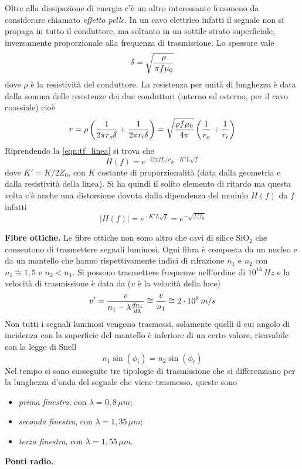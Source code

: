 \documentclass[a4paper,portrait,12pt]{article}
\theoremstyle{definition}
\begin{document}
Oltre alla dissipazione di energia c'è un altro interessante fenomeno da considerare chiamato \textit{effetto
pelle}. In un cavo elettrico infatti il segnale non si propaga in tutto il conduttore, ma soltanto in 
un sottile strato superficiale, inversamente proporzionale alla frequenza di trasmissione. Lo spessore vale
\begin{equation}
\delta = \sqrt{\rho \over \pi f \mu_0}
\end{equation}
dove $\rho$ è la resistività del conduttore. La resistenza per unità di lunghezza è data dalla somma delle
resistenze dei due conduttori (interno ed esterno, per il cavo coassiale) cioè
\begin{equation}
r = \rho \left({1 \over 2\pi r_o \delta} + {1 \over 2\pi r_i \delta}\right) = 
\sqrt{\rho f \mu_0 \over 4 \pi}\left({1\over r_o} + {1\over r_i}\right)
\end{equation}
Riprendendo la \ref{eqn:tf_linea} si trova che
\begin{equation}
H(f) = e^{-i 2\pi f L/v} e^{-K'L\sqrt{f}}
\end{equation}
dove $K' = K/2Z_0$, con $K$ costante di proporzionalità (data dalla geometria e dalla resistività della linea).
Si ha quindi il solito elemento di ritardo ma questa volta c'è anche una distorsione dovuta dalla dipendenza 
del modulo $H(f)$ da $f$ infatti
\begin{equation}
\left|H(f)\right| = e^{-K'L\sqrt{f}} = e^{-\sqrt{f/f_0}}
\end{equation}
\bigskip

\textbf{Fibre ottiche.} Le fibre ottiche non sono altro che cavi di silice $\text{SiO}_2$ che consentono
di trasmettere segnali luminosi. Ogni fibra è composta da un nucleo e da un mantello che hanno rispettivamente
indici di rifrazione $n_1$ e $n_2$ con $n_1 \cong 1,5$ e $n_2 < n_1$. Si possono trasmettere frequenze
nell'ordine di $10^{14}\,Hz$ e la velocità di trasmissione è data da ($v$ è la velocità della luce)
\begin{equation}
v' = {v \over n_1 - \lambda {dn_1 \over d \lambda}} \cong {v \over n_1} \cong 2\cdot 10^8 \, m/s
\end{equation}
Non tutti i segnali luminosi vengono trasmessi, solamente quelli il cui angolo di incidenza con la superficie
del mantello è inferiore di un certo valore, ricavabile con la legge di Snell
\begin{equation}
n_1 \sin(\phi_i) = n_2 \sin(\phi_t)
\end{equation}
Nel tempo si sono susseguite tre tipologie di trasmissione che si differenziano per la lunghezza d'onda
del segnale che viene trasmesso, queste sono
\begin{itemize}
\item \textit{prima finestra}, con $\lambda = 0,8\,\mu m$;
\item \textit{seconda finestra}, con $\lambda = 1,35\,\mu m$;
\item \textit{terza finestra}, con $\lambda = 1,55\,\mu m$.
\end{itemize}
\bigskip

\textbf{Ponti radio.}
\bigskip
\end{document}
